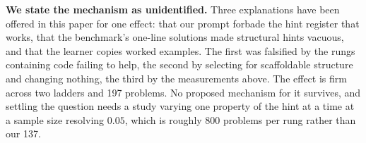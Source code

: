 \textbf{We state the mechanism as unidentified.} Three explanations have been
offered in this paper for one effect: that our prompt forbade the hint register
that works, that the benchmark's one-line solutions made structural hints
vacuous, and that the learner copies worked examples. The first was falsified by
the rungs containing code failing to help, the second by selecting for
scaffoldable structure and changing nothing, the third by the measurements
above. The effect is firm across two ladders and 197 problems. No proposed
mechanism for it survives, and settling the question needs a study varying one
property of the hint at a time at a sample size resolving $0.05$, which is
roughly 800 problems per rung rather than our 137.
